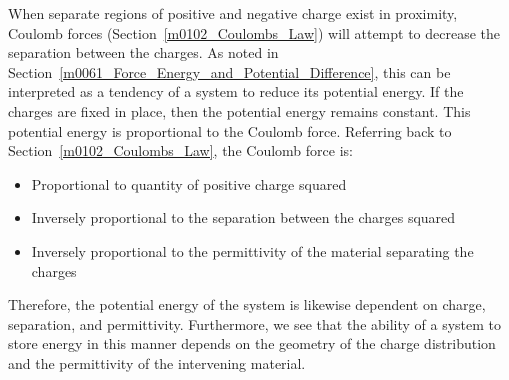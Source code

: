 

\label{m0112_Capacitance} %

When separate regions of positive and negative charge exist in proximity, Coulomb forces (Section~\ref{m0102_Coulombs_Law}) will attempt to decrease the separation between the charges.
As noted in Section~\ref{m0061_Force_Energy_and_Potential_Difference}, this can be interpreted as a tendency of a system to reduce its potential energy.
If the charges are fixed in place, then the potential energy remains constant.  
This potential energy is proportional to the Coulomb force.
Referring back to Section~\ref{m0102_Coulombs_Law}, the Coulomb force is:
%
\begin{itemize}
\item Proportional to quantity of positive charge squared  
\item Inversely proportional to the separation between the charges squared
\item Inversely proportional to the permittivity of the material separating the charges
\end{itemize}
Therefore, the potential energy of the system is likewise dependent on charge, separation, and permittivity.
Furthermore, we see that the ability of a system to store energy in this manner depends on the geometry of the charge distribution and the permittivity of the intervening material.  

